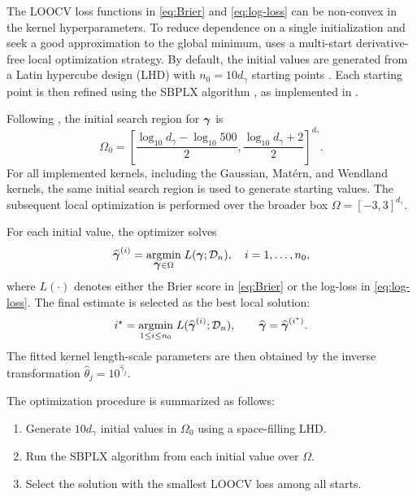\documentclass[article, shortnames]{jss}
\renewcommand{\vec}[1]{\mbox{\boldmath ${#1}$}}
\def\argmin{\mbox{\rm argmin}}
\begin{document}
The LOOCV loss functions in \eqref{eq:Brier} and \eqref{eq:log-loss} can be non-convex in the kernel hyperparameters. 
To reduce dependence on a single initialization and seek a good approximation to the global minimum,  uses a multi-start derivative-free local optimization strategy. 
By default, the initial values are generated from a Latin hypercube design (LHD) with $n_0=10d_\gamma$ starting points \citep{Loeppky:2009}. 
Each starting point is then refined using the SBPLX algorithm \citep{Rowan1990SBPLX}, as implemented in  \citep{Johnson2007NLopt}.

Following \citet{MacDonald2015GPfit}, the initial search region for $\vec{\gamma}$ is
\begin{equation}\label{eq:gamma-bound}
	\Omega_0 =	\left[	\frac{\log_{10} d_\gamma-\log_{10} 500}{2},
	\frac{\log_{10}d_\gamma+2}{2}	\right]^{d_\gamma}.
\end{equation}
For all implemented kernels, including the Gaussian, Mat{\'e}rn, and Wendland kernels, the same initial search region is used to generate starting values. 
The subsequent local optimization is performed over the broader box $\Omega=[-3,3]^{d_\gamma}$.

For each initial value, the optimizer solves
\[
	\widehat{\vec{\gamma}}^{(i)} = \underset{\vec{\gamma} \in \Omega}{\argmin}\; L(\vec{\gamma};\mathcal{D}_n), \quad i=1,\ldots, n_0,
\]
where $L(\cdot)$ denotes either the Brier score in \eqref{eq:Brier} or the log-loss in \eqref{eq:log-loss}. 
The final estimate is selected as the best local solution:
\[
	i^\star = \underset{1\leq i\leq n_0}{\argmin}\; L(\widehat{\vec{\gamma}}^{(i)};\mathcal{D}_n),
	\qquad
	\widehat{\vec{\gamma}}=\widehat{\vec{\gamma}}^{(i^\star)}.
\]
The fitted kernel length-scale parameters are then obtained by the inverse transformation $\widehat{\theta}_j=10^{\widehat{\gamma}_j}$.

The optimization procedure is summarized as follows:
\begin{enumerate}
	\item Generate $10d_\gamma$ initial values in $\Omega_0$ using a space-filling LHD.
	\item Run the SBPLX algorithm from each initial value over $\Omega$.
	\item Select the solution with the smallest LOOCV loss among all starts.
\end{enumerate}
\end{document}
